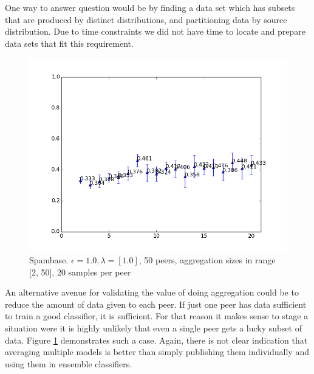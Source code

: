 One way to answer question would be by finding a data set which has subsets that are produced by distinct distributions, and partitioning data by source distribution. Due to time constraints we did not have time to locate and prepare data sets that fit this requirement. 

\begin{figure}[h!]
	\centering
	\includegraphics[width=\textwidth]{fig/spambase/ShowingPotentialUsefulnessOfLargerGroups-eps1.0,budg=eps,peers50,groups2-20,reg2e-2-dataMax20-pubAll-LRbyCV-retuning}
	\caption{Spambase. $\epsilon = 1.0, \lambda = [1.0]$, 50 peers, aggregation sizes in range [2, 50], 20 samples per peer}
	\label{fig:groupsize_limiteddata}
\end{figure}



An alternative avenue for validating the value of doing aggregation could be to reduce the amount of data given to each peer. If just one peer has data sufficient to train a good classifier, it is sufficient. For that reason it makes sense to stage a situation were it is highly unlikely that even a single peer gets a lucky subset of data. Figure \ref{fig:groupsize_limiteddata} demonstrates such a case. Again, there is not clear indication that averaging multiple models is better than simply publishing them individually and using them in ensemble classifiers.



